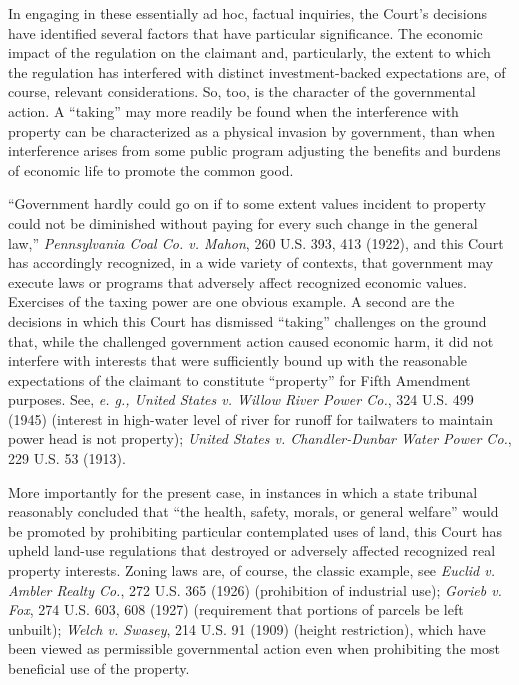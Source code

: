 In engaging in these essentially ad hoc, factual inquiries, the Court's
decisions have identified several factors that have particular significance. The
economic impact of the regulation on the claimant and, particularly, the extent
to which the regulation has interfered with distinct investment-backed
expectations are, of course, relevant considerations. So, too, is the character
of the governmental action. A ``taking'' may more readily be found when the
interference with property can be characterized as a physical invasion by
government, than when interference arises from some public program adjusting the
benefits and burdens of economic life to promote the common good.

``Government hardly could go on if to some extent values incident to property
could not be diminished without paying for every such change in the general
law,'' \textit{Pennsylvania Coal Co. v. Mahon}, 260 U.S. 393, 413 (1922), and
this Court has accordingly recognized, in a wide variety of contexts, that
government may execute laws or programs that adversely affect recognized
economic values. Exercises of the taxing power are one obvious example. A second
are the decisions in which this Court has dismissed ``taking'' challenges on the
ground that, while the challenged government action caused economic harm, it did
not interfere with interests that were sufficiently bound up with the reasonable
expectations of the claimant to constitute ``property'' for Fifth Amendment
purposes. See, \textit{e. g., United States v. Willow River Power Co.}, 324 U.S.
499 (1945) (interest in high-water level of river for runoff for tailwaters to
maintain power head is not property); \textit{United States v. Chandler-Dunbar
Water Power Co.}, 229 U.S. 53 (1913).

More importantly for the present case, in instances in which a state tribunal
reasonably concluded that ``the health, safety, morals, or general welfare''
would be promoted by prohibiting particular contemplated uses of land, this
Court has upheld land-use regulations that destroyed or adversely affected
recognized real property interests. Zoning laws are, of course, the classic
example, see \textit{Euclid v. Ambler Realty Co.}, 272 U.S. 365 (1926)
(prohibition of industrial use); \textit{Gorieb v. Fox}, 274 U.S. 603, 608
(1927) (requirement that portions of parcels be left unbuilt); \textit{Welch v.
Swasey}, 214 U.S. 91 (1909) (height restriction), which have been viewed as
permissible governmental action even when prohibiting the most beneficial use of
the property. 

